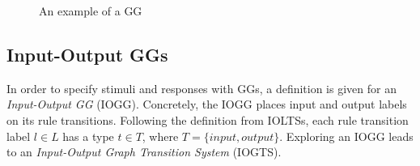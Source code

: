 \begin{figure}[ht]
  \begin{center}
    \hspace{20px}
    \hspace{20px}
    
    \hspace{20px}
    \hspace{20px}
  \end{center}
  \caption{An example of a GG}
  \label{fig:gts}
\end{figure}

\subsection{Input-Output GGs}
In order to specify stimuli and responses with GGs, a definition is given for an \textit{Input-Output GG} (IOGG). Concretely, the IOGG places input and output labels on its rule transitions. Following the definition from IOLTSs, each rule transition label $l \in L$ has a type $t \in T$, where $T = \{input, output\}$. Exploring an IOGG leads to an \textit{Input-Output Graph Transition System} (IOGTS).
